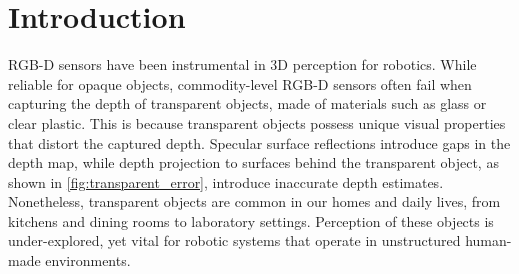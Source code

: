 \documentclass{article}
\begin{document}
\begin{abstract}
    
    
\end{abstract}



\section{Introduction}

RGB-D sensors have been instrumental in 3D perception for robotics. While reliable for opaque objects, commodity-level RGB-D sensors often fail when capturing the depth of transparent objects, made of materials such as glass or clear plastic. This is because transparent objects possess unique visual properties that distort the captured depth. Specular surface reflections introduce gaps in the depth map, while depth projection to surfaces behind the transparent object, as shown in \autoref{fig:transparent_error}, introduce inaccurate depth estimates. Nonetheless, transparent objects are common in our homes and daily lives, from kitchens and dining rooms to laboratory settings. Perception of these objects is under-explored, yet vital for robotic systems that operate in unstructured human-made environments.

\end{document}
